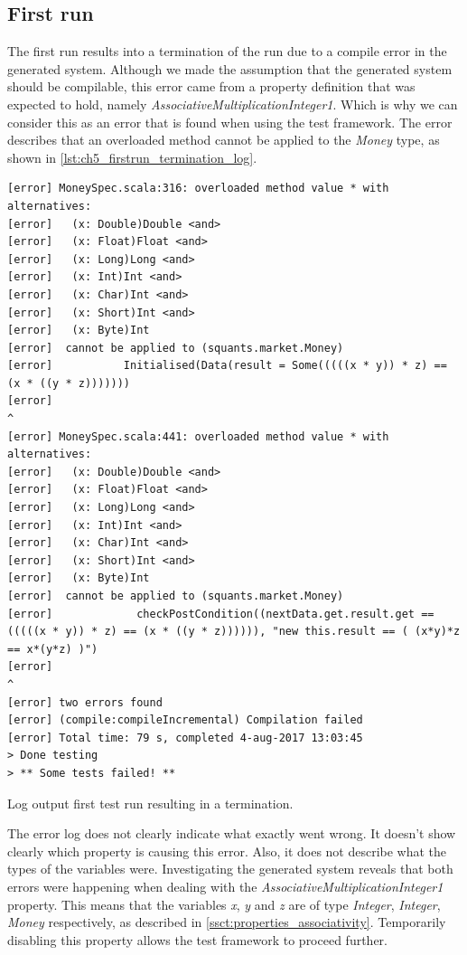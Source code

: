 \subsection{First run}
The first run results into a termination of the run due to a compile error in the generated system. Although we made the assumption that the generated system should be compilable, this error came from a property definition that was expected to hold, namely \textit{AssociativeMultiplicationInteger1}. Which is why we can consider this as an error that is found when using the test framework. The error describes that an overloaded method cannot be applied to the \textit{Money} type, as shown in \autoref{lst:ch5_firstrun_termination_log}.
\begin{sourcecode}[!ht]
\begin{lstlisting}[language=Log]
[error] MoneySpec.scala:316: overloaded method value * with alternatives:
[error]   (x: Double)Double <and>
[error]   (x: Float)Float <and>
[error]   (x: Long)Long <and>
[error]   (x: Int)Int <and>
[error]   (x: Char)Int <and>
[error]   (x: Short)Int <and>
[error]   (x: Byte)Int
[error]  cannot be applied to (squants.market.Money)
[error]           Initialised(Data(result = Some(((((x * y)) * z) == (x * ((y * z)))))))
[error]                                                                 ^
[error] MoneySpec.scala:441: overloaded method value * with alternatives:
[error]   (x: Double)Double <and>
[error]   (x: Float)Float <and>
[error]   (x: Long)Long <and>
[error]   (x: Int)Int <and>
[error]   (x: Char)Int <and>
[error]   (x: Short)Int <and>
[error]   (x: Byte)Int
[error]  cannot be applied to (squants.market.Money)
[error]             checkPostCondition((nextData.get.result.get == (((((x * y)) * z) == (x * ((y * z)))))), "new this.result == ( (x*y)*z == x*(y*z) )")
[error]                                                                                    ^
[error] two errors found
[error] (compile:compileIncremental) Compilation failed
[error] Total time: 79 s, completed 4-aug-2017 13:03:45
> Done testing
> ** Some tests failed! **
\end{lstlisting}
\caption{Log output first test run resulting in a termination.}
\label{lst:ch5_firstrun_termination_log}
\end{sourcecode}
\FloatBarrier
The error log does not clearly indicate what exactly went wrong. It doesn't
show clearly which property is causing this error. Also, it does not describe
what the types of the variables were. Investigating the generated system reveals
that both errors were happening when dealing with the
\textit{AssociativeMultiplicationInteger1} property. This means that the
variables \textit{x}, \textit{y} and \textit{z} are of type \textit{Integer},
\textit{Integer}, \textit{Money} respectively, as described in
\autoref{ssct:properties_associativity}. Temporarily disabling this property allows the
test framework to proceed further.

